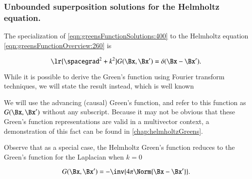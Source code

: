 %
%
\subsubsection{Unbounded superposition solutions for the Helmholtz equation.}

The specialization of \cref{eqn:greensFunctionSolutions:400} to the Helmholtz equation \cref{eqn:greensFunctionOverview:260} is

\begin{dmath}\label{eqn:greensFunctionHelmholtz:420}
\lr{ \spacegrad^2 + k^2 } G(\Bx, \Bx') = \delta(\Bx - \Bx').
\end{dmath}

While it is possible \citep{schwinger1998classical} to derive the Green's function using Fourier transform techniques, we will state the result instead, which is well known


We will use the advancing (causal) Green's function, and refer to this function as \( G(\Bx, \Bx') \) without any subscript.
Because it may not be obvious that these
Green's function representations are valid in a multivector context, a demonstration of this fact can be found in \cref{chap:helmholtzGreens}.

Observe that as a special case, the Helmholtz Green's function reduces to the Green's function for the Laplacian when \( k = 0 \)

\begin{dmath}\label{eqn:greensFunctionHelmholtz:80}
G(\Bx, \Bx') = -\inv{ 4 \pi \Norm{\Bx - \Bx'}}.
\end{dmath}

